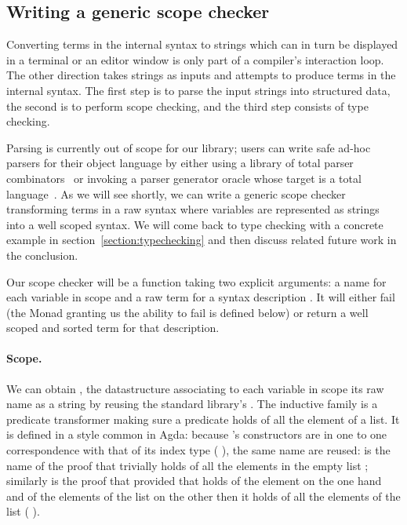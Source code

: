 \subsection{Writing a generic scope checker}\label{section:genericscoping}

Converting terms in the internal syntax to strings which can in turn be
displayed in a terminal or an editor window is only part of a compiler's
interaction loop. The other direction takes strings as inputs and attempts to
produce terms in the internal syntax. The first step is to parse the input
strings into structured data, the second is to perform scope checking,
and the third step consists of type checking.

Parsing is currently out of scope for our library; users can write safe
ad-hoc parsers for their object language by either using a library of total
parser combinators~\cite{DBLP:conf/icfp/Danielsson10,allais2018agdarsec}
or invoking a parser generator oracle whose target is a total
language~\cite{Stump:2016:VFP:2841316}. As we will see shortly, we can
write a generic scope checker transforming terms in a raw syntax where
variables are represented as strings into a well scoped syntax. We will
come back to type checking with a concrete example in section~\ref{section:typechecking}
and then discuss related future work in the conclusion.

Our scope checker will be a function taking two explicit arguments: a
name for each variable in scope  and a raw term for a syntax
description .  It will either fail (the Monad  granting
us the ability to fail is defined below) or return a well scoped and
sorted term for that description.

\begin{agdasnippet}
\end{agdasnippet}

\paragraph*{Scope.} We can obtain , the datastructure associating to
each variable in scope its raw name as a string by reusing the standard library's
. The inductive family  is a predicate transformer making sure a
predicate holds of all the element of a list. It is defined in a style common in
Agda: because 's constructors are in one to one correspondence with that
of its index type ( ), the same name are reused: \AIC{[]} is the
name of the proof that  trivially holds of all the elements in the empty
list \AIC{[]}; similarly  is the proof that provided that  holds
of the element  on the one hand and of the elements of the list 
on the other then it holds of all the elements of the list (  ).

